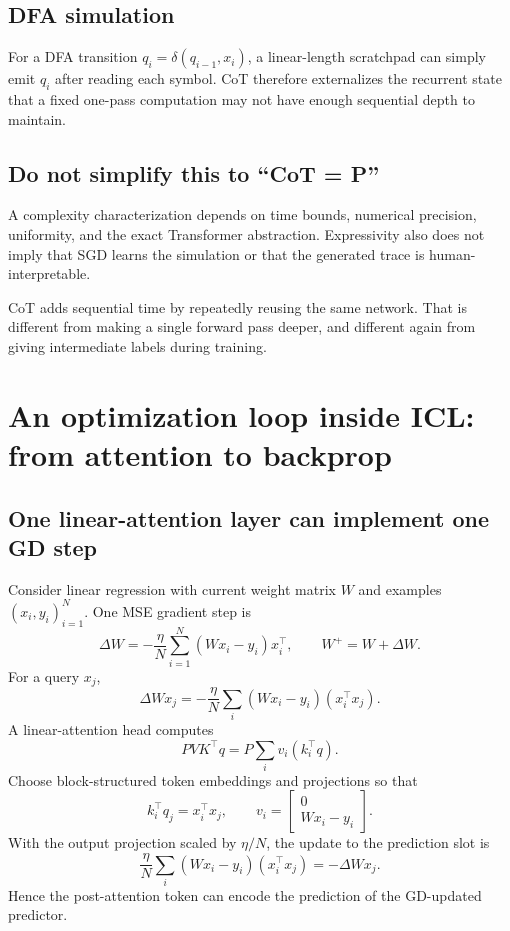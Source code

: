 \documentclass[11pt,a4paper,oneside,openany]{memoir}
\theoremstyle{definition}
\begin{document}
\section{DFA simulation}
For a DFA transition $q_i=\delta(q_{i-1},x_i)$, a linear-length scratchpad can simply emit $q_i$ after reading each symbol.  CoT therefore externalizes the recurrent state that a fixed one-pass computation may not have enough sequential depth to maintain.

\section{Do not simplify this to ``CoT = P''}
A complexity characterization depends on time bounds, numerical precision, uniformity, and the exact Transformer abstraction.  Expressivity also does not imply that SGD learns the simulation or that the generated trace is human-interpretable.

\begin{presentbox}
CoT adds sequential time by repeatedly reusing the same network.  That is different from making a single forward pass deeper, and different again from giving intermediate labels during training.
\end{presentbox}

\chapter{An optimization loop inside ICL: from attention to backprop}
\section{One linear-attention layer can implement one GD step}
Consider linear regression with current weight matrix $W$ and examples $(x_i,y_i)_{i=1}^N$.  One MSE gradient step is
\[
\Delta W=-\frac\eta N\sum_{i=1}^N(Wx_i-y_i)x_i^\top,
\qquad W^+=W+\Delta W.
\]
For a query $x_j$,
\[
\Delta W x_j
=-\frac\eta N\sum_i(Wx_i-y_i)(x_i^\top x_j).
\]
A linear-attention head computes
\[
PVK^\top q=P\sum_i v_i(k_i^\top q).
\]
Choose block-structured token embeddings and projections so that
\[
k_i^\top q_j=x_i^\top x_j,
\qquad
v_i=\begin{bmatrix}0\\Wx_i-y_i\end{bmatrix}.
\]
With the output projection scaled by $\eta/N$, the update to the prediction slot is
\[
\frac\eta N\sum_i(Wx_i-y_i)(x_i^\top x_j)=-\Delta W x_j.
\]
Hence the post-attention token can encode the prediction of the GD-updated predictor.
\end{document}

